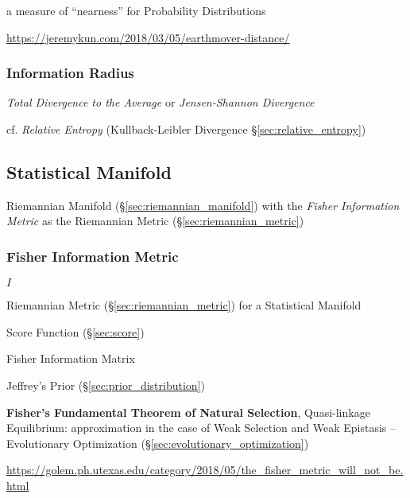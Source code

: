 a measure of ``nearness'' for Probability Distributions

\url{https://jeremykun.com/2018/03/05/earthmover-distance/}



\subsubsection{Information Radius}\label{sec:information_radius}

\emph{Total Divergence to the Average} or \emph{Jensen-Shannon Divergence}

cf. \emph{Relative Entropy} (Kullback-Leibler Divergence
\S\ref{sec:relative_entropy})



\subsection{Statistical Manifold}\label{sec:statistical_manifold}

Riemannian Manifold (\S\ref{sec:riemannian_manifold}) with the
\emph{Fisher Information Metric} as the Riemannian Metric
(\S\ref{sec:riemannian_metric})



\subsubsection{Fisher Information Metric}\label{sec:fisher_metric}

$I$

Riemannian Metric (\S\ref{sec:riemannian_metric}) for a Statistical Manifold

Score Function (\S\ref{sec:score})

Fisher Information Matrix

Jeffrey's Prior (\S\ref{sec:prior_distribution})

\fist \textbf{Fisher's Fundamental Theorem of Natural Selection},
Quasi-linkage Equilibrium: approximation in the case of Weak Selection
and Weak Epistasis -- Evolutionary Optimization
(\S\ref{sec:evolutionary_optimization}) %

\url{https://golem.ph.utexas.edu/category/2018/05/the_fisher_metric_will_not_be.html}



